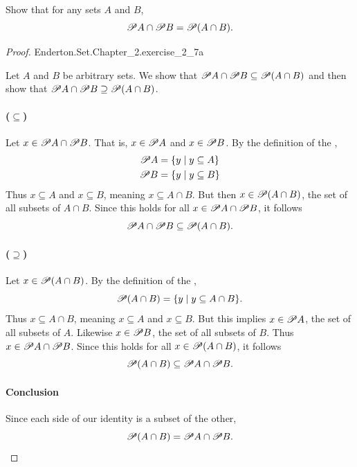 \documentclass{report}
\begin{document}
Show that for any sets $A$ and $B$,
  $$\mathscr{P}A \cap \mathscr{P}B = \mathscr{P}(A \cap B).$$

\begin{proof}

    {Enderton.Set.Chapter\_2.exercise\_2\_7a}

  Let $A$ and $B$ be arbitrary sets. We show that
    $\mathscr{P}A \cap \mathscr{P}B \subseteq \mathscr{P}(A \cap B)$ and then
    show that $\mathscr{P}A \cap \mathscr{P}B \supseteq \mathscr{P}(A \cap B)$.

  \paragraph{($\subseteq$)}%

    Let $x \in \mathscr{P}A \cap \mathscr{P}B$.
    That is, $x \in \mathscr{P}A$ and $x \in \mathscr{P}B$.
    By the definition of the ,
      \begin{align*}
        \mathscr{P}A & = \{ y \mid y \subseteq A \} \\
        \mathscr{P}B & = \{ y \mid y \subseteq B \}
      \end{align*}
    Thus $x \subseteq A$ and $x \subseteq B$, meaning $x \subseteq A \cap B$.
    But then $x \in \mathscr{P}(A \cap B)$, the set of all subsets of
      $A \cap B$.
    Since this holds for all $x \in \mathscr{P}A \cap \mathscr{P}B$, it follows
      $$\mathscr{P}A \cap \mathscr{P}B \subseteq \mathscr{P}(A \cap B).$$

  \paragraph{($\supseteq$)}%

    Let $x \in \mathscr{P}(A \cap B)$.
    By the definition of the ,
      $$\mathscr{P}(A \cap B) = \{ y \mid y \subseteq A \cap B \}.$$
    Thus $x \subseteq A \cap B$, meaning $x \subseteq A$ and $x \subseteq B$.
    But this implies $x \in \mathscr{P}A$, the set of all subsets of $A$.
    Likewise $x \in \mathscr{P}B$, the set of all subsets of $B$.
    Thus $x \in \mathscr{P}A \cap \mathscr{P}B$.
    Since this holds for all $x \in \mathscr{P}(A \cap B)$, it follows
      $$\mathscr{P}(A \cap B) \subseteq \mathscr{P}A \cap \mathscr{P}B.$$

  \paragraph{Conclusion}%

    Since each side of our identity is a subset of the other,
      $$\mathscr{P}(A \cap B) = \mathscr{P}A \cap \mathscr{P}B.$$

\end{proof}
\end{document}
